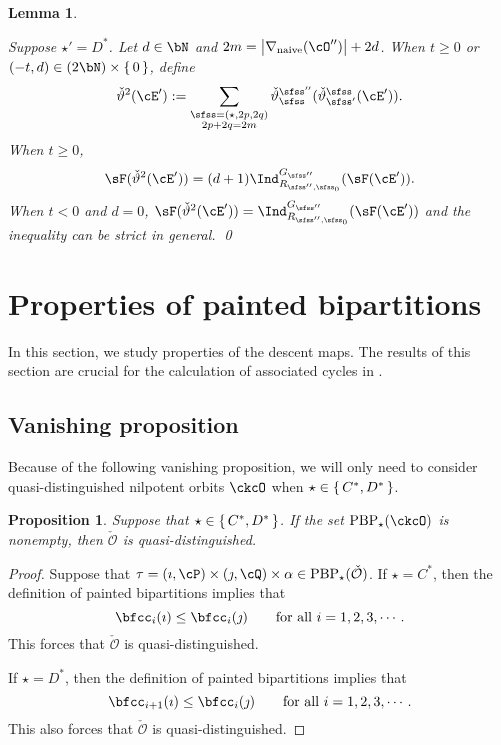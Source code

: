 \documentclass[12pt,a4paper]{amsart}
\def\abs#1{\left|{#1}\right|}
\newcommand{\CO}{{\mathcal {O}}}
\def\DD{\nabla}
\numberwithin{equation}{section}
\newtheorem{lem}[thm]{Lemma}
\newtheorem{prop}[thm]{Proposition}
\theoremstyle{remark}
\def\DDn{\DD_{\mathrm{naive}}}
\def\cOpp{\cO^{\prime\prime}}
\def\PBP{\mathrm{PBP}}
\begin{document}
{\begin{lem}
\begin{enuma}
 \item Suppose $\star' = D^*$.
    Let $d\in \bN$ and $2m = \abs{\DDn(\cOpp)}+2d$.
    When $t\geq 0$ or $(-t,d) \in (2\bN)\times \set{0}$, define
 \[
   \dblift(\cE') :=
   \sum_{\substack{\sfss = (\star,2p,2q)\\ 2p+2q=2m}}
   \dlift_{\sfss}^{\sfss''}(\dlift_{\sfss'}^{\sfss}(\cE')).
   \]
  When $t\geq 0$,
  \[
    \sF(\dblift(\cE')) = (d+1) \indsss(\sF(\cE')).
  \]
  When $t< 0$ and $d=0$,  $\sF(\dblift(\cE')) = \indsss(\sF(\cE'))$
  and the inequality can be strict in general. \qed
  \end{enuma}
\end{lem}
}



\section{Properties of painted bipartitions}
\def\ckfgg{{\check \fgg}}
\def\pcT{\cT^+}
\def\ncT{\cT^-}

In this section, we study properties of the descent maps. The results of this section are
crucial for the calculation of associated cycles in .


\subsection{Vanishing proposition}

Because of the following vanishing proposition, we will only need to consider
quasi-distinguished nilpotent orbits $\ckcO$ when $\star\in \set{C^*, D^*}$.

\begin{prop}\label{prop:CD*}
  Suppose that $\star\in \set{C^*, D^*}$. If the set $\PBP_\star(\ckcO)$ is nonempty, then $\check \CO$ is quasi-distinguished.
\end{prop}
\begin{proof}
  Suppose that $\tau=(\imath,\cP)\times(\jmath,\cQ)\times \alpha \in  \mathrm{PBP}_\star(\check \CO)$. If  $\star=C^*$, then  the definition of painted bipartitions implies that
 \[
 \bfcc_i(\imath)\leq \bfcc_i(\jmath) \qquad \textrm{for all } i=1,2,3, \cdots.
 \]
This forces that $\check \CO$ is quasi-distinguished.

 If  $\star=D^*$, then  the definition of painted bipartitions implies that
 \[
 \bfcc_{i+1}(\imath)\leq \bfcc_i(\jmath) \qquad \textrm{for all } i=1,2,3, \cdots.
 \]
This  also forces that   $\check \CO$ is quasi-distinguished.
 \end{proof}
\end{document}
